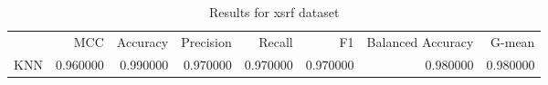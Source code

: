 \begin{table}
\caption{Results for xsrf dataset}
\begin{tabular}{lrrrrrrr}
 & MCC & Accuracy & Precision & Recall & F1 & Balanced Accuracy & G-mean \\
KNN & 0.960000 & 0.990000 & 0.970000 & 0.970000 & 0.970000 & 0.980000 & 0.980000 \\
\end{tabular}
\end{table}
